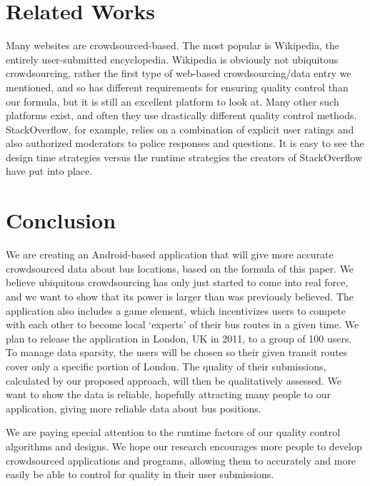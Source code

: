 \documentclass{sig-alternate-05-2015}
\begin{document}
	\section{Related Works}	
	Many websites are crowdsourced-based. The most popular is Wikipedia, the entirely user-submitted encyclopedia. Wikipedia is obviously not ubiquitous crowdsourcing, rather the first type of web-based crowdsourcing/data entry we mentioned, and so has different requirements for ensuring quality control than our formula, but it is still an excellent platform to look at. Many other such platforms exist, and often they use drastically different quality control methods. StackOverflow, for example, relies on a combination of explicit user ratings and also authorized moderators to police responses and questions. It is easy to see the design time strategies versus the runtime strategies the creators of StackOverflow have put into place. 
	
	\newpage
	\section{Conclusion}	
	We are creating an Android-based application that will give more accurate crowdsourced data about bus locations, based on the formula of this paper. We believe ubiquitous crowdsourcing has only just started to come into real force, and we want to show that its power is larger than was previously believed. The application also includes a game element, which incentivizes users to compete with each other to become local `experts' of their bus routes in a given time. We plan to release the application in London, UK in 2011, to a group of 100 users. To manage data sparsity, the users will be chosen so their given transit routes cover only a specific portion of London. The quality of their submissions, calculated by our proposed approach, will then be qualitatively assessed. We want to show the data is reliable, hopefully attracting many people to our application, giving more reliable data about bus positions. 
	
	We are paying special attention to the runtime factors of our quality control algorithms and designs. We hope our research encourages more people to develop crowdsourced applications and programs, allowing them to accurately and more easily be able to control for quality in their user submissions.
	
	
	
\end{document}
